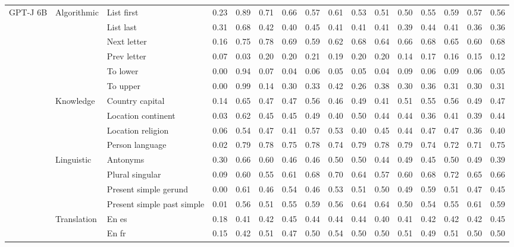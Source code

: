 \begin{center}
\begin{longtable}{lllrrrrrrrrrrrrr}
\multirow[t]{18}{*}{GPT-J 6B} & \multirow[t]{6}{*}{Algorithmic} & List first & 0.23 & 0.89 & 0.71 & 0.66 & 0.57 & 0.61 & 0.53 & 0.51 & 0.50 & 0.55 & 0.59 & 0.57 & 0.56 \\
 &  & List last & 0.31 & 0.68 & 0.42 & 0.40 & 0.45 & 0.41 & 0.41 & 0.41 & 0.39 & 0.44 & 0.41 & 0.36 & 0.36 \\
 &  & Next letter & 0.16 & 0.75 & 0.78 & 0.69 & 0.59 & 0.62 & 0.68 & 0.64 & 0.66 & 0.68 & 0.65 & 0.60 & 0.68 \\
 &  & Prev letter & 0.07 & 0.03 & 0.20 & 0.20 & 0.21 & 0.19 & 0.20 & 0.20 & 0.14 & 0.17 & 0.16 & 0.15 & 0.12 \\
 &  & To lower & 0.00 & 0.94 & 0.07 & 0.04 & 0.06 & 0.05 & 0.05 & 0.04 & 0.09 & 0.06 & 0.09 & 0.06 & 0.05 \\
 &  & To upper & 0.00 & 0.99 & 0.14 & 0.30 & 0.33 & 0.42 & 0.26 & 0.38 & 0.30 & 0.36 & 0.31 & 0.30 & 0.31 \\
\cline{2-16}
 & \multirow[t]{4}{*}{Knowledge} & Country capital & 0.14 & 0.65 & 0.47 & 0.47 & 0.56 & 0.46 & 0.49 & 0.41 & 0.51 & 0.55 & 0.56 & 0.49 & 0.47 \\
 &  & Location continent & 0.03 & 0.62 & 0.45 & 0.45 & 0.49 & 0.40 & 0.50 & 0.44 & 0.44 & 0.36 & 0.41 & 0.39 & 0.44 \\
 &  & Location religion & 0.06 & 0.54 & 0.47 & 0.41 & 0.57 & 0.53 & 0.40 & 0.45 & 0.44 & 0.47 & 0.47 & 0.36 & 0.40 \\
 &  & Person language & 0.02 & 0.79 & 0.78 & 0.75 & 0.78 & 0.74 & 0.79 & 0.78 & 0.79 & 0.74 & 0.72 & 0.71 & 0.75 \\
\cline{2-16}
 & \multirow[t]{4}{*}{Linguistic} & Antonyms & 0.30 & 0.66 & 0.60 & 0.46 & 0.46 & 0.50 & 0.50 & 0.44 & 0.49 & 0.45 & 0.50 & 0.49 & 0.39 \\
 &  & Plural singular & 0.09 & 0.60 & 0.55 & 0.61 & 0.68 & 0.70 & 0.64 & 0.57 & 0.60 & 0.68 & 0.72 & 0.65 & 0.66 \\
 &  & Present simple gerund & 0.00 & 0.61 & 0.46 & 0.54 & 0.46 & 0.53 & 0.51 & 0.50 & 0.49 & 0.59 & 0.51 & 0.47 & 0.45 \\
 &  & Present simple past simple & 0.01 & 0.56 & 0.51 & 0.55 & 0.59 & 0.56 & 0.64 & 0.64 & 0.50 & 0.54 & 0.55 & 0.61 & 0.59 \\
\cline{2-16}
 & \multirow[t]{4}{*}{Translation} & En es & 0.18 & 0.41 & 0.42 & 0.45 & 0.44 & 0.44 & 0.44 & 0.40 & 0.41 & 0.42 & 0.42 & 0.42 & 0.45 \\
 &  & En fr & 0.15 & 0.42 & 0.51 & 0.47 & 0.50 & 0.54 & 0.50 & 0.50 & 0.51 & 0.49 & 0.51 & 0.50 & 0.50 \\

\end{longtable}
\end{center}
